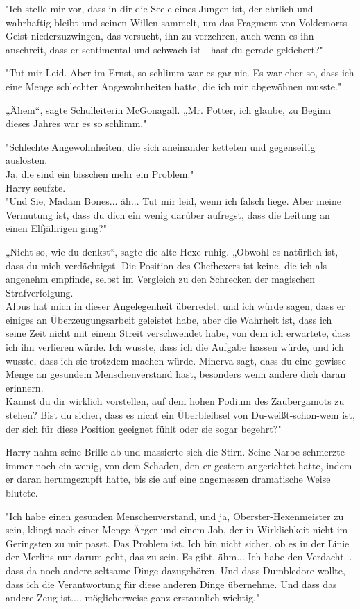 {"Ich stelle mir vor, dass in dir die Seele eines Jungen ist, der ehrlich und wahrhaftig bleibt und seinen Willen sammelt, um das Fragment von Voldemorts Geist niederzuzwingen, das versucht, ihn zu verzehren, auch wenn es ihn anschreit, dass er sentimental und schwach ist - hast du gerade gekichert?"

"Tut mir Leid. Aber im Ernst, so schlimm war es gar nie. Es war eher so, dass ich eine Menge schlechter Angewohnheiten hatte, die ich mir abgewöhnen musste."

„Ähem“, sagte Schulleiterin McGonagall. „Mr. Potter, ich glaube, zu Beginn dieses Jahres war es so schlimm."

"Schlechte Angewohnheiten, die sich aneinander ketteten und gegenseitig auslösten.\\ Ja, die sind ein bisschen mehr ein Problem."\\ Harry seufzte.\\ "Und Sie, Madam Bones... äh... Tut mir leid, wenn ich falsch liege. Aber meine Vermutung ist, dass du dich ein wenig darüber aufregst, dass die Leitung an einen Elfjährigen ging?"

„Nicht so, wie du denkst“, sagte die alte Hexe ruhig. „Obwohl es natürlich ist, dass du mich verdächtigst. Die Position des Chefhexers ist keine, die ich als angenehm empfinde, selbst im Vergleich zu den Schrecken der magischen Strafverfolgung.\\ Albus hat mich in dieser Angelegenheit überredet, und ich würde sagen, dass er einiges an Überzeugungsarbeit geleistet habe, aber die Wahrheit ist, dass ich seine Zeit nicht mit einem Streit verschwendet habe, von dem ich erwartete, dass ich ihn verlieren würde. Ich wusste, dass ich die Aufgabe hassen würde, und ich wusste, dass ich sie trotzdem machen würde. Minerva sagt, dass du eine gewisse Menge an gesundem Menschenverstand hast, besonders wenn andere dich daran erinnern.\\ Kannst du dir wirklich vorstellen, auf dem hohen Podium des Zaubergamots zu stehen? Bist du sicher, dass es nicht ein Überbleibsel von Du-weißt-schon-wem ist, der sich für diese Position geeignet fühlt oder sie sogar begehrt?"

Harry nahm seine Brille ab und massierte sich die Stirn. Seine Narbe schmerzte immer noch ein wenig, von dem Schaden, den er gestern angerichtet hatte, indem er daran herumgezupft hatte, bis sie auf eine angemessen dramatische Weise blutete.

"Ich habe einen gesunden Menschenverstand, und ja, Oberster-Hexenmeister zu sein, klingt nach einer Menge Ärger und einem Job, der in Wirklichkeit nicht im Geringsten zu mir passt. Das Problem ist. Ich bin nicht sicher, ob es in der Linie der Merlins nur darum geht, das zu sein. Es gibt, ähm... Ich habe den Verdacht... dass da noch andere seltsame Dinge dazugehören. Und dass Dumbledore wollte, dass ich die Verantwortung für diese anderen Dinge übernehme. Und dass das andere Zeug ist.... möglicherweise ganz erstaunlich wichtig."

}
